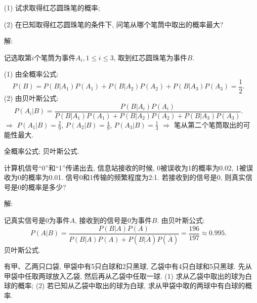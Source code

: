 \documentclass[standard]{ExBook}
\renewenvironment{shaded}{%
  \def\FrameCommand{\fboxsep=\FrameSep \colorbox{shadecolor}}%
  \MakeFramed{\advance\hsize-\width \FrameRestore}%
}{%
  \endMakeFramed
}
\begin{document}
\begin{qitems}
\begin{bbox}
\begin{shaded}
(1) 试求取得红芯圆珠笔的概率;

(2) 在已知取得红芯圆珠笔的条件下, 问笔从哪个笔筒中取出的概率最大?
    \end{shaded}
    \end{bbox}

\vspace{\dimexpr2.5cm-5em\relax}

解: 

记选取第$i$个笔筒为事件$A_{i},1 \leq i \leq 3$, 取到红芯圆珠笔为事件$B$.

(1) 由全概率公式:
$$P(B)=P(B|A_{1})P(A_{1})+P(B|A_{2})P(A_{2})+P(B|A_{3})P(A_{3})=\frac{1}{2}.$$
(2) 由贝叶斯公式:
$$P(A_{i}|B)=\frac{P(B|A_{i})P(A_{i})}{P(B|A_{1})P(A_{1})+P(B|A_{2})P(A_{2})+P(B|A_{3})P(A_{3})}.$$
$\Longrightarrow$ $P(A_{1}|B)=\frac{2}{9}$, $P(A_{2}|B)=\frac{4}{9}$, $P(A_{3}|B)=\frac{1}{3}$ $\Longrightarrow$ 笔从第二个笔筒取出的可能性最大.

\textcolor{themeColor}{\selectfont {} 全概率公式; 贝叶斯公式.}

\vspace{2.5cm-5em}

    \begin{bbox}
    \begin{shaded}
        \qitem
计算机信号“0”和“1”传递出去, 信息站接收的时候, 0被误收为1的概率为0.02, 1被误收为0的概率为0.01. 信号0和1传输的频繁程度为2:1. 若接收到的信号是0, 则真实信号是0的概率是多少?
    \end{shaded}
    \end{bbox}

\vspace{\dimexpr2.5cm-5em\relax}

解: 

记真实信号是0为事件$A$, 接收到的信号是0为事件$B$. 由贝叶斯公式:
$$P(A|B)=\frac{P(B|A)P(A)}{P(B|A)P(A)+P(B|\overline{A})P(\overline{A})}=\frac{196}{197}\approx0.995.$$
\textcolor{themeColor}{\selectfont {} 贝叶斯公式.}

\vspace{2.5cm-5em}

    \begin{bbox}
    \begin{shaded}
        \qitem
有甲、乙两只口袋, 甲袋中有5只白球和2只黑球, 乙袋中有4只白球和5只黑球. 先从甲袋中任取两球放入乙袋, 然后再从乙袋中任取一球.
(1) 求从乙袋中取出的球为白球的概率;
(2) 若已知从乙袋中取出的球为白球, 求从甲袋中取的两球中有白球的概率.
    \end{shaded}
    \end{bbox}


\end{qitems}
\end{document}
